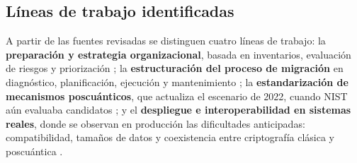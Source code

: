 \subsection{Líneas de trabajo identificadas}

A partir de las fuentes revisadas se distinguen cuatro líneas de trabajo: la \textbf{preparación y estrategia organizacional}, basada en inventarios, evaluación de riesgos y priorización \cite{joseph2022transitioning,cisa2023quantum}; la \textbf{estructuración del proceso de migración} en diagnóstico, planificación, ejecución y mantenimiento \cite{naether2024migrating}; la \textbf{estandarización de mecanismos poscuánticos}, que actualiza el escenario de 2022, cuando NIST aún evaluaba candidatos \cite{nist2024fips203,nist2024fips204,nist2024fips205}; y el \textbf{despliegue e interoperabilidad en sistemas reales}, donde se observan en producción las dificultades anticipadas: compatibilidad, tamaños de datos y coexistencia entre criptografía clásica y poscuántica \cite{westerbaan2025postquantum}.



